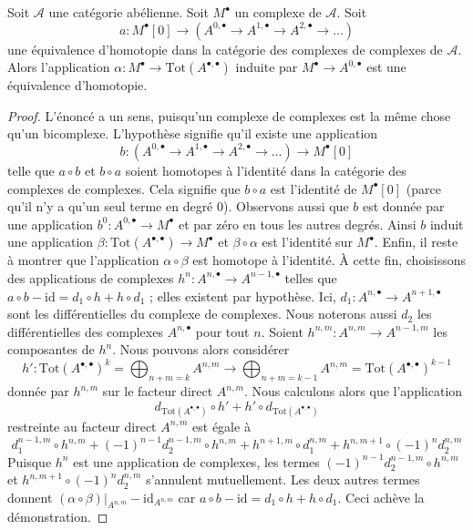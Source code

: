 \begin{lemma}
\label{lemma-homotopy-complex-complexes}
Soit $\mathcal{A}$ une catégorie abélienne.
Soit $M^\bullet$ un complexe de $\mathcal{A}$. Soit
$$
a :
M^\bullet[0]
\longrightarrow
\left(A^{0, \bullet} \to A^{1, \bullet} \to A^{2, \bullet} \to \ldots \right)
$$
une équivalence d'homotopie dans la catégorie des complexes de complexes
de $\mathcal{A}$. Alors l'application
$\alpha : M^\bullet \to \text{Tot}(A^{\bullet, \bullet})$
induite par $M^\bullet \to A^{0, \bullet}$ est une équivalence d'homotopie.
\end{lemma}

\begin{proof}
L'énoncé a un sens, puisqu'un complexe de complexes est la même chose
qu'un bicomplexe. L'hypothèse signifie qu'il existe une application
$$
b :
\left(A^{0, \bullet} \to A^{1, \bullet} \to A^{2, \bullet} \to \ldots \right)
\longrightarrow
M^\bullet[0]
$$
telle que $a \circ b$ et $b \circ a$ soient homotopes à l'identité
dans la catégorie des complexes de complexes. Cela signifie que $b \circ a$
est l'identité de $M^\bullet[0]$ (parce qu'il n'y a qu'un seul terme en
degré $0$). Observons aussi que $b$ est donnée par une application
$b^0 : A^{0, \bullet} \to M^\bullet$ et par zéro en tous les autres degrés.
Ainsi $b$ induit une application
$\beta : \text{Tot}(A^{\bullet, \bullet}) \to M^\bullet$
et $\beta \circ \alpha$ est l'identité sur $M^\bullet$.
Enfin, il reste à montrer que l'application
$\alpha \circ \beta$ est homotope à l'identité.
À cette fin, choisissons des applications de complexes
$h^n : A^{n, \bullet} \to A^{n - 1, \bullet}$
telles que $a \circ b - \text{id} = d_1 \circ h + h \circ d_1$ ;
elles existent par hypothèse. Ici, $d_1 : A^{n, \bullet} \to A^{n + 1, \bullet}$
sont les différentielles du complexe de complexes. Nous noterons aussi
$d_2$ les différentielles des complexes $A^{n, \bullet}$
pour tout $n$. Soient $h^{n, m} : A^{n, m} \to A^{n - 1, m}$ les composantes de
$h^n$. Nous pouvons alors considérer
$$
h' : \text{Tot}(A^{\bullet, \bullet})^k =
\bigoplus\nolimits_{n + m = k} A^{n, m}
\to
\bigoplus\nolimits_{n + m = k - 1} A^{n, m} =
\text{Tot}(A^{\bullet, \bullet})^{k - 1}
$$
donnée par $h^{n, m}$ sur le facteur direct $A^{n, m}$. Nous calculons alors
que l'application
$$
d_{\text{Tot}(A^{\bullet, \bullet})} \circ h' +
h' \circ d_{\text{Tot}(A^{\bullet, \bullet})}
$$
restreinte au facteur direct $A^{n, m}$ est égale à
$$
d_1^{n - 1, m} \circ h^{n, m} +
(-1)^{n - 1} d_2^{n - 1, m} \circ h^{n, m} +
h^{n + 1, m} \circ d_1^{n, m} + h^{n, m + 1} \circ (-1)^nd_2^{n, m}
$$
Puisque $h^n$ est une application de complexes, les termes
$(-1)^{n - 1} d_2^{n - 1, m} \circ h^{n, m}$ et
$h^{n, m + 1} \circ (-1)^nd_2^{n, m}$ s'annulent mutuellement.
Les deux autres termes donnent
$(\alpha \circ \beta)|_{A^{n, m}} - \text{id}_{A^{n, m}}$
car $a \circ b - \text{id} = d_1 \circ h + h \circ d_1$.
Ceci achève la démonstration.
\end{proof}

